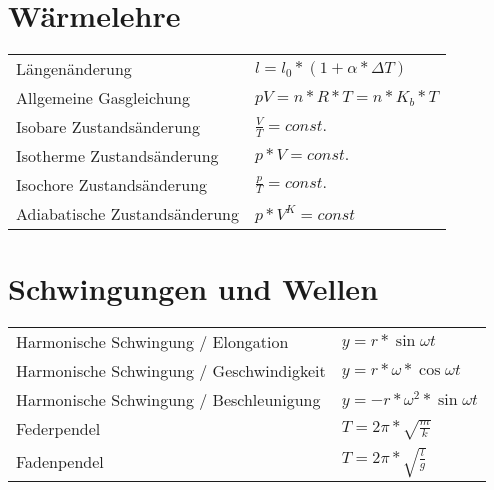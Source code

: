 \documentclass[11pt,a4paper]{paper}
\begin{document}
\section{Wärmelehre}
\begin{tabularx}{\textwidth}{X|X}
	Längenänderung & $l = l_0 * (1 + \alpha * \Delta T)$\\
	Allgemeine Gasgleichung & $pV = n*R*T = n *K_b * T$\\
	Isobare Zustandsänderung & $\frac{V}{T} = const.$\\
	Isotherme Zustandsänderung & $p*V = const.$\\
	Isochore Zustandsänderung & $\frac{p}{T} = const.$\\
	Adiabatische Zustandsänderung & $p * V^K = const$
\end{tabularx}
\section{Schwingungen und Wellen}
\begin{tabularx}{\textwidth}{X|X}
Harmonische Schwingung / Elongation & $y = r * \sin{\omega t}$\\
Harmonische Schwingung / Geschwindigkeit & $y = r * \omega * \cos{\omega t}$\\
Harmonische Schwingung / Beschleunigung & $y = -r * \omega^2 * \sin{\omega t}$\\
Federpendel & $T = 2\pi * \sqrt{\frac{m}{k}}$\\
Fadenpendel & $T= 2\pi * \sqrt{\frac{l}{g}}$\\
\end{tabularx}
\end{document}
